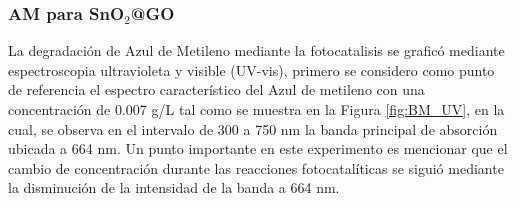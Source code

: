 \documentclass[12pt]{article}
\begin{document}
\subsubsection{AM para SnO$\displaystyle _{2}$@GO}
La degradación de Azul de Metileno mediante la fotocatalisis se graficó mediante espectroscopia ultravioleta y visible (UV-vis), primero se considero como punto de referencia el espectro característico del Azul de metileno con una concentración de 0.007 g/L tal como se muestra en la Figura \ref{fig:BM_UV}, en la cual, se observa en el intervalo de 300 a 750 nm la banda principal de absorción ubicada a 664 nm. 
Un punto importante en este experimento es mencionar que el cambio de concentración durante las reacciones fotocatalíticas se siguió mediante la disminución de la intensidad de la banda a 664 nm.
\vspace{1em} %
\end{document}

